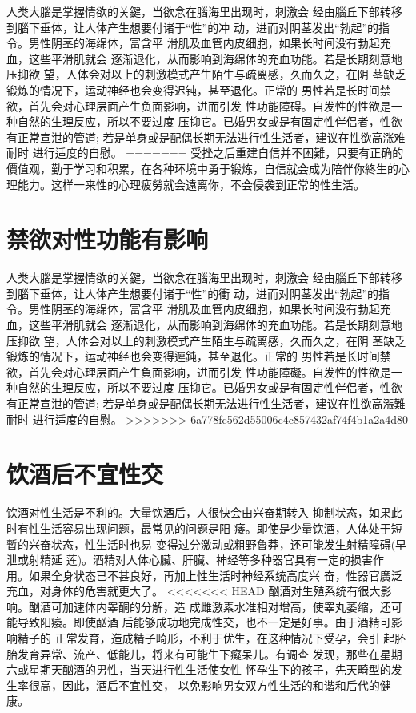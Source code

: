 \documentclass[12pt,UTF8]{ctexbook}
\begin{document}
人类大腦是掌握情欲的关鍵，当欲念在腦海里出现时，刺激会
经由腦丘下部转移到腦下垂体，让人体产生想要付诸于“性”的冲
动，进而对阴茎发出“勃起”的指令。男性阴茎的海绵体，富含平
滑肌及血管内皮细胞，如果长时间没有勃起充血，这些平滑肌就会
逐渐退化，从而影响到海绵体的充血功能。若是长期刻意地压抑欲
望，人体会对以上的刺激模式产生陌生与疏离感，久而久之，在阴
茎缺乏锻炼的情况下，运动神经也会变得迟钝，甚至退化。正常的
男性若是长时间禁欲，首先会对心理层面产生负面影响，进而引发
性功能障碍。自发性的性欲是一种自然的生理反应，所以不要过度
压抑它。已婚男女或是有固定性伴侣者，性欲有正常宣泄的管道;
若是单身或是配偶长期无法进行性生活者，建议在性欲高涨难耐时
进行适度的自慰。
=======
受挫之后重建自信并不困難，只要有正确的價值观，勤于学习和积累，在各种环境中勇于锻炼，自信就会成为陪伴你終生的心理能力。这样一来性的心理疲勞就会遠离你，不会侵袭到正常的性生活。

\section{禁欲对性功能有影响}

人类大腦是掌握情欲的关鍵，当欲念在腦海里出现时，刺激会
经由腦丘下部转移到腦下垂体，让人体产生想要付诸于“性”的衝
动，进而对阴茎发出“勃起”的指令。男性阴茎的海绵体，富含平
滑肌及血管内皮细胞，如果长时间没有勃起充血，这些平滑肌就会
逐漸退化，从而影响到海绵体的充血功能。若是长期刻意地压抑欲
望，人体会对以上的刺激模式产生陌生与疏离感，久而久之，在阴
茎缺乏锻炼的情况下，运动神经也会变得遲鈍，甚至退化。正常的
男性若是长时间禁欲，首先会对心理层面产生負面影响，进而引发
性功能障礙。自发性的性欲是一种自然的生理反应，所以不要过度
压抑它。已婚男女或是有固定性伴侣者，性欲有正常宣泄的管道;
若是单身或是配偶长期无法进行性生活者，建议在性欲高漲難耐时
进行适度的自慰。
>>>>>>> 6a778fc562d55006c4c857432af74f4b1a2a4d80

\section{饮酒后不宜性交}

饮酒对性生活是不利的。大量饮酒后，人很快会由兴奋期转入
抑制状态，如果此时有性生活容易出现问题，最常见的问题是阳
痿。即使是少量饮酒，人体处于短暫的兴奋状态，性生活时也易
变得过分激动或粗野魯莽，还可能发生射精障碍(早泄或射精延
莲)。酒精对人体心臟、肝臟、神经等多种器官具有一定的损害作
用。如果全身状态已不甚良好，再加上性生活时神经系统高度兴
奋，性器官廣泛充血，对身体的危害就更大了。
<<<<<<< HEAD
酗酒对生殖系统有很大影响。酗酒可加速体内睾酮的分解，造
成雌激素水准相对增高，使睾丸萎缩，还可能导致阳痿。即使酗酒
后能够成功地完成性交，也不一定是好事。由于酒精可影响精子的
正常发育，造成精子畸形，不利于优生，在这种情况下受孕，会引
起胚胎发育异常、流产、低能儿，将来有可能生下癡呆儿。有调查
发现，那些在星期六或星期天酗酒的男性，当天进行性生活使女性
怀孕生下的孩子，先天畸型的发生率很高，因此，酒后不宜性交，
以免影响男女双方性生活的和谐和后代的健康。
\end{document}
